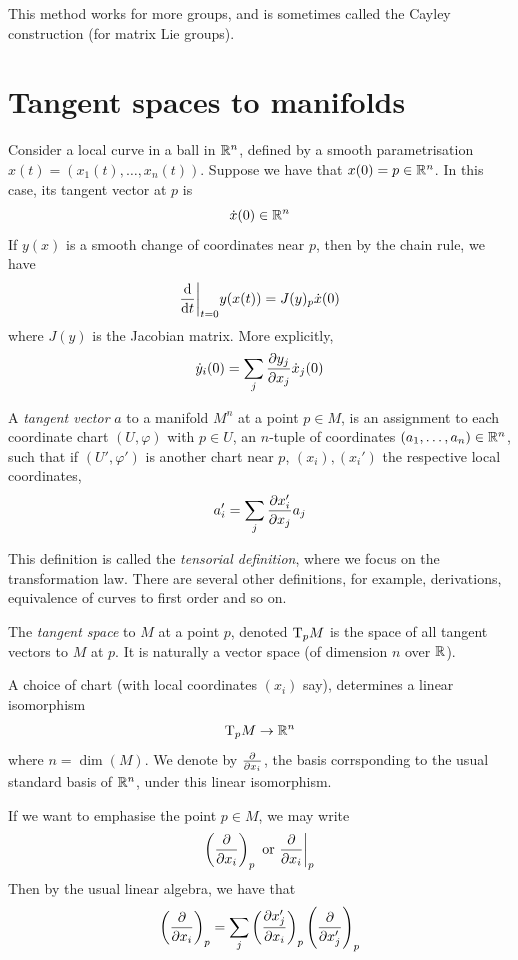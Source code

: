 \documentclass{article}
\begin{document}
This method works for more groups, and is sometimes called the Cayley construction (for matrix Lie groups).

\section{Tangent spaces to manifolds}

Consider a local curve in a ball in \(\mathbb{R}^n\), defined by a smooth parametrisation \(x(t) = (x_1(t), \dots, x_n(t))\). Suppose we have that \(x(0) = p \in \mathbb{R}^n\). In this case, its tangent vector at \(p\) is
\[\dot x(0)\in \mathbb{R}^n\]
If \(y(x)\) is a smooth change of coordinates near \(p\), then by the chain rule, we have
\[\dv{t}\bigg\vert_{t=0}y(x(t)) = J(y)_p \dot x(0)\]
where \(J(y)\) is the Jacobian matrix. More explicitly,
\[\dot y_i(0) = \sum_j \pdv{y_j}{x_j}(p)\dot x_j(0)\]

\begin{definition}
    A \emph{tangent vector} \(a\) to a manifold \(M^n\) at a point \(p \in M\), is an assignment to each coordinate chart \((U, \varphi)\) with \(p \in U\), an \(n\)-tuple of coordinates \((a_1, \dots, a_n) \in \mathbb{R}^n\), such that if \((U', \varphi')\) is another chart near \(p\), \((x_i), (x_i')\) the respective local coordinates,
    \[a_i' = \sum_j \pdv{x_i'}{x_j}(p)a_j\] 
\end{definition}

This definition is called the \emph{tensorial definition}, where we focus on the transformation law. There are several other definitions, for example, derivations, equivalence of curves to first order and so on.

\begin{definition}
    The \emph{tangent space} to \(M\) at a point \(p\), denoted \(\mathrm{T}_pM\) is the space of all tangent vectors to \(M\) at \(p\). It is naturally a vector space (of dimension \(n\) over \(\mathbb{R}\)).
\end{definition}

\lec

A choice of chart (with local coordinates \((x_i)\) say), determines a linear isomorphism
\[\mathrm{T}_p M \to \mathbb{R}^n\]
where \(n = \dim(M)\). We denote by \(\pdv{x_i}\), the basis corrsponding to the usual standard basis of \(\mathbb{R}^n\), under this linear isomorphism.

If we want to emphasise the point \(p \in M\), we may write
\[\left(\pdv{x_i}\right)_p \text{ or }\pdv{x_i}\bigg\vert_p\]
Then by the usual linear algebra, we have that
\[\left(\pdv{x_i}\right)_p = \sum_j \left(\pdv{x_j'}{x_i}\right)_p \left(\pdv{x_j'}\right)_p\]
\end{document}
